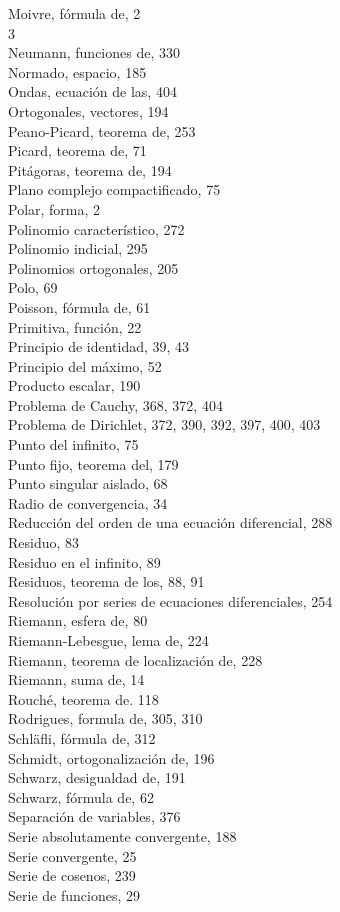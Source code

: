 \documentclass[10pt]{article}
\theoremstyle{plain}
\theoremstyle{definition}
\theoremstyle{remark}
\begin{document}
Moivre, fórmula de, 2\\
3\\
Neumann, funciones de, 330\\
Normado, espacio, 185\\
Ondas, ecuación de las, 404\\
Ortogonales, vectores, 194\\
Peano-Picard, teorema de, 253\\
Picard, teorema de, 71\\
Pitágoras, teorema de, 194\\
Plano complejo compactificado, 75\\
Polar, forma, 2\\
Polinomio característico, 272\\
Polinomio indicial, 295\\
Polinomios ortogonales, 205\\
Polo, 69\\
Poisson, fórmula de, 61\\
Primitiva, función, 22\\
Principio de identidad, 39, 43\\
Principio del máximo, 52\\
Producto escalar, 190\\
Problema de Cauchy, 368, 372, 404\\
Problema de Dirichlet, 372, 390, 392, 397, 400, 403\\
Punto del infinito, 75\\
Punto fijo, teorema del, 179\\
Punto singular aislado, 68\\
Radio de convergencia, 34\\
Reducción del orden de una ecuación diferencial, 288\\
Residuo, 83\\
Residuo en el infinito, 89\\
Residuos, teorema de los, 88, 91\\
Resolución por series de ecuaciones diferenciales, 254\\
Riemann, esfera de, 80\\
Riemann-Lebesgue, lema de, 224\\
Riemann, teorema de localización de, 228\\
Riemann, suma de, 14\\
Rouché, teorema de. 118\\
Rodrigues, formula de, 305, 310\\
Schläfli, fórmula de, 312\\
Schmidt, ortogonalización de, 196\\
Schwarz, desigualdad de, 191\\
Schwarz, fórmula de, 62\\
Separación de variables, 376\\
Serie absolutamente convergente, 188\\
Serie convergente, 25\\
Serie de cosenos, 239\\
Serie de funciones, 29
\end{document}
